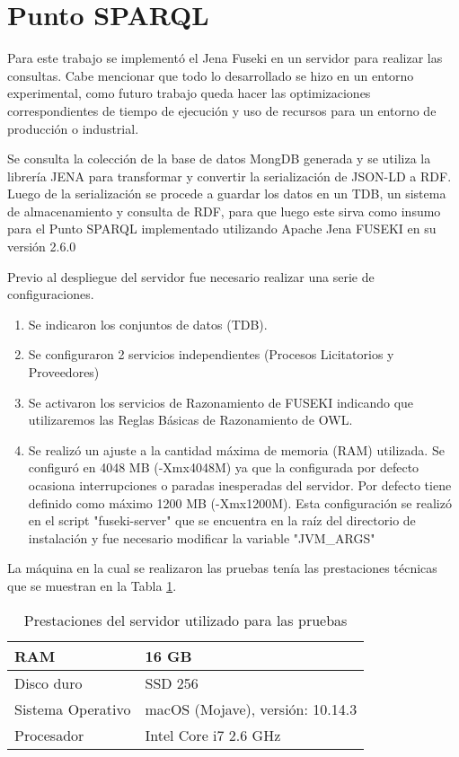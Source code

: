 \section{Punto SPARQL}
\label{section:puntosparql}

Para este trabajo se implementó el Jena Fuseki\cite{ApacheJe97:online} en un servidor para realizar las consultas. Cabe mencionar que todo lo desarrollado se hizo en un entorno experimental, como futuro trabajo queda hacer las optimizaciones correspondientes de tiempo de ejecución y uso de recursos para un entorno de producción o industrial.

Se consulta la colección de la base de datos MongDB generada y se utiliza la librería JENA para transformar y convertir la serialización de JSON-LD a RDF. Luego de la serialización se procede a guardar los datos en un TDB, un sistema de almacenamiento y consulta de RDF, para que luego este sirva como insumo para el Punto SPARQL implementado utilizando Apache Jena FUSEKI en su versión 2.6.0

Previo al despliegue del servidor fue necesario realizar una serie de configuraciones.

\begin{enumerate}
    \item Se indicaron los conjuntos de datos (TDB).
    \item Se configuraron 2 servicios independientes (Procesos Licitatorios y Proveedores)
    \item Se activaron los servicios de Razonamiento de FUSEKI indicando que utilizaremos las Reglas Básicas de Razonamiento de OWL. 
    \item Se realizó un ajuste a la cantidad máxima de memoria (RAM) utilizada. Se configuró en 4048 MB (-Xmx4048M) ya que la configurada por defecto ocasiona interrupciones o paradas inesperadas del servidor. Por defecto tiene definido como máximo 1200 MB (-Xmx1200M). Esta configuración se realizó en el script "fuseki-server" que se encuentra en la raíz del directorio de instalación y fue necesario modificar la variable "JVM\_ARGS"

\end{enumerate}

La máquina en la cual se realizaron las pruebas tenía las prestaciones técnicas que se muestran en la Tabla \ref{tab:prestaciones_servidor}.


\begin{table}[!htb]
\centering
    \caption{Prestaciones del servidor utilizado para las pruebas}
    \label{tab:prestaciones_servidor}
\begin{tabular}{|l|l|}
\hline
 RAM & 16 GB\\\hline
    Disco duro & SSD 256\\\hline
    Sistema Operativo & macOS (Mojave), versión: 10.14.3\\\hline
    Procesador & Intel Core i7 2.6 GHz\\\hline
\end{tabular}
\end{table}


